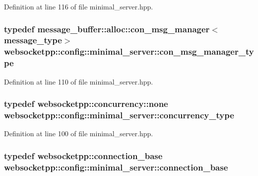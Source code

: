 Definition at line 116 of file minimal\+\_\+server.\+hpp.

\hypertarget{structwebsocketpp_1_1config_1_1minimal__server_a005ebd181cca0e5adb553146733870b5}{}
\subsubsection[{con\+\_\+msg\+\_\+manager\+\_\+type}]{\setlength{\rightskip}{0pt plus 5cm}typedef {\bf message\+\_\+buffer\+::alloc\+::con\+\_\+msg\+\_\+manager}$<${\bf message\+\_\+type}$>$ {\bf websocketpp\+::config\+::minimal\+\_\+server\+::con\+\_\+msg\+\_\+manager\+\_\+type}}\label{structwebsocketpp_1_1config_1_1minimal__server_a005ebd181cca0e5adb553146733870b5}


Definition at line 110 of file minimal\+\_\+server.\+hpp.

\hypertarget{structwebsocketpp_1_1config_1_1minimal__server_a54e2bde35814bd82607f618aacd3ec88}{}
\subsubsection[{concurrency\+\_\+type}]{\setlength{\rightskip}{0pt plus 5cm}typedef {\bf websocketpp\+::concurrency\+::none} {\bf websocketpp\+::config\+::minimal\+\_\+server\+::concurrency\+\_\+type}}\label{structwebsocketpp_1_1config_1_1minimal__server_a54e2bde35814bd82607f618aacd3ec88}


Definition at line 100 of file minimal\+\_\+server.\+hpp.

\hypertarget{structwebsocketpp_1_1config_1_1minimal__server_ab58e7a2f5284bef92d724fa607515f2b}{}
\subsubsection[{connection\+\_\+base}]{\setlength{\rightskip}{0pt plus 5cm}typedef {\bf websocketpp\+::connection\+\_\+base} {\bf websocketpp\+::config\+::minimal\+\_\+server\+::connection\+\_\+base}}\label{structwebsocketpp_1_1config_1_1minimal__server_ab58e7a2f5284bef92d724fa607515f2b}


